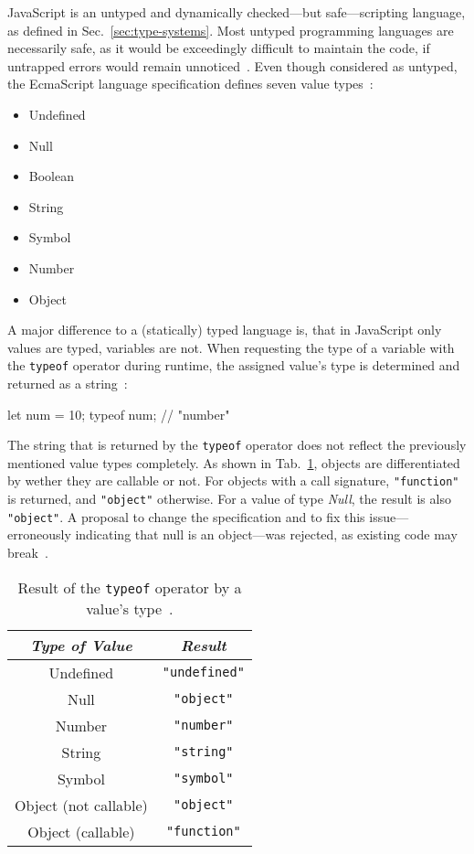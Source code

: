 JavaScript is an untyped and dynamically checked---but safe---scripting language, as defined in Sec.~\ref{sec:type-systems}. Most untyped programming languages are necessarily safe, as it would be exceedingly difficult to maintain the code, if untrapped errors would remain unnoticed~\cite[p.~4]{TypeSystems:Cardelli:2004}. Even though considered as untyped, the EcmaScript language specification defines seven value types~\cite[p.~16]{ES6Spec:Ecma:2015}:
\begin{itemize}
  \item Undefined
  \item Null
  \item Boolean
  \item String
  \item Symbol
  \item Number
  \item Object
\end{itemize}
A major difference to a (statically) typed language is, that in JavaScript only values are typed, variables are not. When requesting the type of a variable with the \texttt{typeof} operator during runtime, the assigned value's type is determined and returned as a string~\cite[p.~30]{YDKJS:UpAndGoing:Simpson:2015}:
\begin{JsCode}[numbers=none]
let num = 10;
typeof num; // "number"
\end{JsCode}
The string that is returned by the \texttt{typeof} operator does not reflect the previously mentioned value types completely. As shown in Tab.~\ref{tab:typeof}, objects are differentiated by wether they are callable or not. For objects with a call signature, \texttt{"function"} is returned, and \texttt{"object"} otherwise. For a value of type \emph{Null}, the result is also \texttt{"object"}. A proposal to change the specification and to fix this issue---erroneously indicating that null is an object---was rejected, as existing code may break~\cite{TypeofNull:Smith:2013, typeof:MDN:2017}.

\begin{table}
\caption{Result of the \texttt{typeof} operator by a value's type~\cite[p.~164]{ES6Spec:Ecma:2015}.}
\label{tab:typeof}
\centering
  \setlength{\tabcolsep}{5mm}
  \def\arraystretch{1.25}
  \small
  \begin{tabular}{|c|c|}
    \hline
    \emph{Type of Value} & \emph{Result} \\
    \hline \hline
    Undefined & \texttt{"undefined"} \\
    \hline
    Null & \texttt{"object"} \\
    \hline
    Number & \texttt{"number"} \\
    \hline
    String & \texttt{"string"} \\
    \hline
    Symbol & \texttt{"symbol"} \\
    \hline
    Object (not callable) & \texttt{"object"} \\
    \hline
    Object (callable) & \texttt{"function"} \\
    \hline
  \end{tabular}
\end{table}

